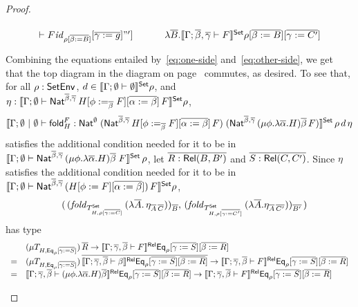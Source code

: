\documentclass[acmsmall,review,anonymous]{acmart}
\theoremstyle{definition}
\newcommand{\set}{\mathsf{Set}}
\renewcommand{\id}{\mathit{id}}
\begin{document}
\begin{proof}
\begin{itemize}
{\begin{equation}
\begin{tikzcd}[row sep = huge]
{{      \vdash F} \id_{\rho [\ol{\beta := B}]} [\ol{\gamma := g}]}"'] &
\lambda \ol{B}.\setsem{\Gamma; \ol{\beta}, \ol{\gamma} \vdash F} \rho [\ol{\beta :=
    B}] [\ol{\gamma := C'}]
\end{tikzcd}
\end{equation}}
Combining the equations entailed by~\ref{eq:one-side}
and~\ref{eq:other-side}, we get that
the top diagram in the diagram on
  page~\pageref{page:dia1} commutes, as desired.
To see that, for all $\rho : \mathsf{SetEnv}$, $d \in
\setsem{\Gamma; \emptyset \vdash \emptyset}\rho$, and $\eta :
\setsem{\Gamma; \emptyset \vdash \Nat^{\ol{\beta},
    \ol{\gamma}}\,H[\phi :=_{\ol{\beta}} F][\ol{\alpha := \beta}]\,F}
\rho$,
\[\setsem{\Gamma; \emptyset~|~\emptyset
  \vdash \fold^F_H : \Nat^\emptyset\;(\Nat^{\ol{\beta},
    \ol{\gamma}}\,H[\phi :=_{\ol{\beta}} F][\ol{\alpha :=
      \beta}]\,F)\; (\Nat^{{\ol{\beta},\ol{\gamma}} }\,(\mu
  \phi.\lambda \overline \alpha.H)\overline \beta\,F)}\,\rho\,d\,\eta\]
satisfies the additional condition needed for it to be in
$\setsem{\Gamma;\emptyset \vdash \Nat^{{\ol{\beta},\ol{\gamma}}
  }\,(\mu \phi.\lambda \overline \alpha.H)\overline \beta\;F}\,\rho$,
let $\overline{R : \mathsf{Rel}(B,B')}$ and $\overline{S : \mathsf{Rel}(C,C')}$.  Since $\eta$
satisfies the additional condition needed for it to be in
$\setsem{\Gamma; \emptyset \vdash \Nat^{\ol{\beta},
    \ol{\gamma}}\,(H[\phi := F][\ol{\alpha := \beta}])\,F} \rho$,
\[\begin{array}{ll}
 & (\,(\mathit{fold}_{T^\set_{H,\rho[\ol{\gamma :=
        C}]}}\,(\lambda \ol{A}.\,\eta_{\ol{A}\,\ol{C}}))_{\ol{B}},\,
(\mathit{fold}_{T^\set_{H,\rho[\ol{\gamma :=
        C'}]}}\,(\lambda \ol{A}.\eta_{\ol{A}\,\ol{C'}}))_{\ol{B'}}\,) 
\end{array}\]
has type
\[\begin{array}{ll}
  & (\mu T_{H,\mathsf{Eq}_\rho[\overline{\gamma := S}]}) \,\overline{R} \to
\llbracket{\Gamma;\overline{\gamma},\overline{\beta} \vdash F}\rrbracket^{\mathsf{Rel}}\mathsf{Eq}_\rho[\overline{\gamma := 
    S}][\overline{\beta:= R}]\\ 
= & (\mu T_{H,\mathsf{Eq}_\rho[\overline{\gamma :=
      S}]})\,\overline{\llbracket{\Gamma;\overline{\gamma},\overline{\beta} 
  \vdash \beta}\rrbracket^{\mathsf{Rel}}\mathsf{Eq}_\rho[\overline{\gamma := S}][\overline{\beta := R}]} \to
\llbracket{\Gamma;\overline{\gamma},\overline{\beta} \vdash F}\rrbracket^{\mathsf{Rel}}\mathsf{Eq}_\rho[\overline{\gamma := 
    S}][\overline{\beta:= R}]\\ 
= & \llbracket{\Gamma; \overline{\gamma},\overline{\beta} \vdash (\mu \phi. \lambda
  \overline{\alpha}. H)\overline{\beta}}\rrbracket^{\mathsf{Rel}}\mathsf{Eq}_\rho[\overline{\gamma := S}][\overline{\beta := R}] \to
\llbracket{\Gamma;\overline{\gamma},\overline{\beta} \vdash F}\rrbracket^{\mathsf{Rel}}\mathsf{Eq}_\rho[\overline{\gamma := 
    S}][\overline{\beta:= R}]
\qedhere
\end{array}\]


\end{itemize}
\end{proof}
\end{document}
